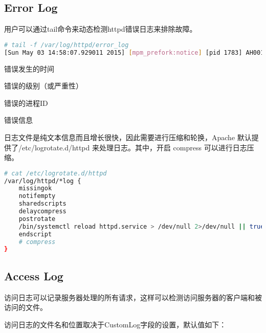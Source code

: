 \subsection{Error Log}


用户可以通过tail命令来动态检测httpd错误日志来排除故障。



\begin{lstlisting}[language=bash]
# tail -f /var/log/httpd/error_log
[Sun May 03 14:58:07.929011 2015] [mpm_prefork:notice] [pid 1783] AH00163: Apache/2.4.10 (Fedora) OpenSSL/1.0.1k-fips PHP/5.6.8 configured -- resuming normal operations
\end{lstlisting}

\begin{compactitem}
\item 错误发生的时间
\item 错误的级别（或严重性）
\item 错误的进程ID
\item 错误信息
\end{compactitem}


日志文件是纯文本信息而且增长很快，因此需要进行压缩和轮换，Apache 默认提供了/etc/logrotate.d/httpd 来处理日志。其中，开启 compress 可以进行日志压缩。




\begin{lstlisting}[language=bash]
# cat /etc/logrotate.d/httpd
/var/log/httpd/*log {
	missingok
	notifempty
	sharedscripts
	delaycompress
	postrotate
	/bin/systemctl reload httpd.service > /dev/null 2>/dev/null || true
	endscript
	# compress
}
\end{lstlisting}


\subsection{Access Log}


访问日志可以记录服务器处理的所有请求，这样可以检测访问服务器的客户端和被访问的文件。

访问日志的文件名和位置取决于CustomLog字段的设置，默认值如下：


